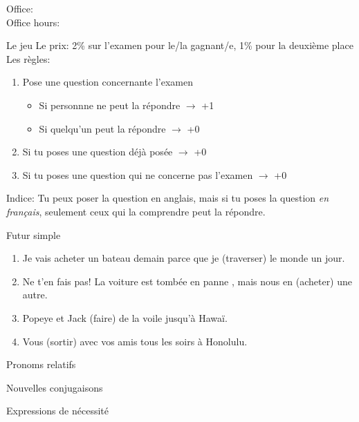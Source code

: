 \documentclass{beamer}
\subtitle[Révision, examen 2]{Révision de l'examen 2 (Ch 8 \& 9)}
\begin{document}
  \begin{frame}
    \titlepage
    \tiny{Office: \\
          Office hours: }
  \end{frame}

  \begin{frame}{Le jeu}
    \alert{Le prix:} 2\% sur l'examen pour le/la gagnant/e, 1\% pour la deuxième place \\
    \alert{Les règles:}
    \begin{enumerate}
      \item Pose une question concernante l'examen
      \begin{itemize}
        \item Si personnne ne peut la répondre $\to$ +1
        \item Si quelqu'un peut la répondre $\to$ +0
      \end{itemize}
      \item Si tu poses une question déjà posée $\to$ +0
      \item Si tu poses une question qui ne concerne pas l'examen $\to$ +0
    \end{enumerate}
    \alert{Indice:} Tu peux poser la question en anglais, mais si tu poses la question \emph{en français}, seulement ceux qui la comprendre peut la répondre.
  \end{frame}

  \begin{frame}{Futur simple}
    \begin{enumerate}
      \item Je vais acheter un bateau demain parce que je \underline{} (traverser) le monde un jour.
      \item Ne t'en fais pas! La voiture est tombée en panne , mais nous en \underline{} (acheter) une autre.
      \item Popeye et Jack \underline{} (faire) de la voile jusqu'à Hawaï.
      \item Vous \underline{} (sortir) avec vos amis tous les soirs à Honolulu.
    \end{enumerate}
  \end{frame}


  \begin{frame}{Pronoms relatifs}
    
  \end{frame}

  \begin{frame}{Nouvelles conjugaisons}
    
  \end{frame}

  \begin{frame}{Expressions de nécessité}
    
  \end{frame}
\end{document}
